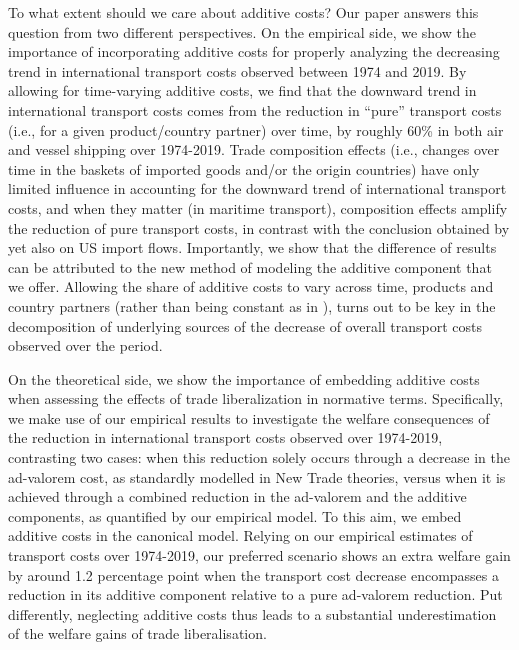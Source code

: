 \documentclass[a4paper,11pt]{article}
\begin{document}
To what extent should we care about additive costs? Our paper answers this question from two different perspectives.
On the empirical side, we show the importance of incorporating additive costs for properly analyzing the decreasing trend in international transport costs observed between 1974 and 2019. By allowing for time-varying additive costs, we find that the downward trend in international transport costs comes from the reduction in ``pure'' transport costs (i.e., for a given product/country partner) over time, by roughly 60\% in both air and vessel shipping over 1974-2019. Trade composition effects (i.e., changes over time in the baskets of imported goods and/or the origin countries) have only limited influence in accounting for the downward trend of international transport costs, and when they matter (in maritime transport), composition effects amplify the reduction of pure transport costs, in contrast with the conclusion obtained by \cite{hummels2007} yet also on US import flows.
Importantly, we show that the difference of results can be attributed to the new method of modeling the additive component that we offer. Allowing the share of additive costs to vary across time, products and country partners (rather than being constant as in \citealp{hummels2007}), turns out to be key in the decomposition of underlying sources of the decrease of overall transport costs observed over the period.\smallskip

On the theoretical side, we show the importance of embedding additive costs when assessing the effects of trade liberalization in normative terms. Specifically, we make use of our empirical results to investigate the welfare consequences of the reduction in international transport costs observed over 1974-2019, contrasting two cases: when this reduction solely occurs through a decrease in the ad-valorem cost, as standardly modelled in New Trade theories, versus when it is achieved through a combined reduction in the ad-valorem and the additive components, as quantified by our empirical model. To this aim, we embed additive costs in the canonical \cite{melitz} model. Relying on our empirical estimates of transport costs
over 1974-2019, our preferred scenario shows an extra welfare gain by around 1.2 percentage point when the transport cost decrease encompasses a reduction in its additive component relative to a pure ad-valorem reduction. Put differently, neglecting additive costs thus leads to a substantial underestimation of the welfare gains of trade liberalisation.
\end{document}
